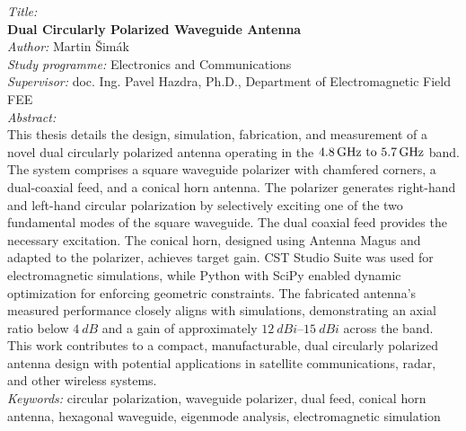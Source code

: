 \clearpage
\noindent\textit{Title:}\\
\textbf{Dual Circularly Polarized Waveguide Antenna}\\[0.25cm]
\textit{Author:} Martin Šimák\\[0.25cm]
\textit{Study programme:} Electronics and Communications\\[0.25cm]
\textit{Supervisor:} doc. Ing. Pavel Hazdra, Ph.D., Department of Electromagnetic Field FEE\\[0.25cm]
\textit{Abstract:}\\
This thesis details the design, simulation, fabrication, and measurement of a novel dual circularly polarized antenna operating in the $\frequencyrange$ band. The system comprises a square waveguide polarizer with chamfered corners, a dual-coaxial feed, and a conical horn antenna. The polarizer generates right-hand and left-hand circular polarization by selectively exciting one of the two fundamental modes of the square waveguide. The dual coaxial feed provides the necessary excitation. The conical horn, designed using Antenna Magus and adapted to the polarizer, achieves target gain. CST Studio Suite was used for electromagnetic simulations, while Python with SciPy enabled dynamic optimization for enforcing geometric constraints. The fabricated antenna's measured performance closely aligns with simulations, demonstrating an axial ratio below $\qty{4}{dB}$ and a gain of approximately $\qtyrange{12}{15}{dBi}$ across the band. This work contributes to a compact, manufacturable, dual circularly polarized antenna design with potential applications in satellite communications, radar, and other wireless systems.\\[0.25cm]
\textit{Keywords:} circular polarization, waveguide polarizer, dual feed, conical horn antenna, hexagonal waveguide, eigenmode analysis, electromagnetic simulation\\[0.5cm]

